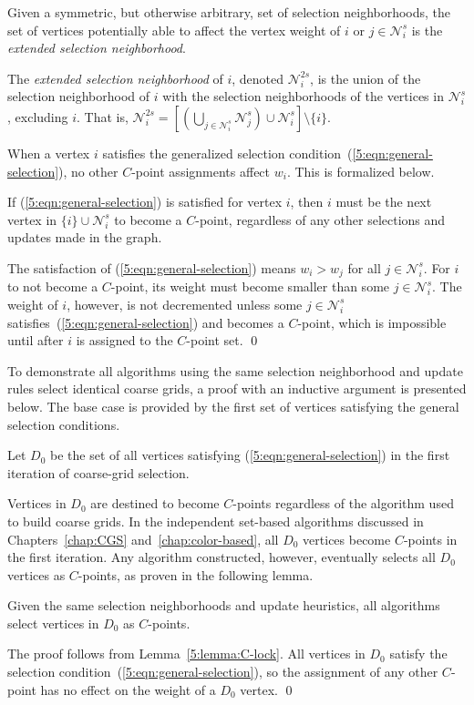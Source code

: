 \documentclass{elsart}
\newenvironment{proof}{\begin{pf}}{\qed\end{pf}}
\begin{document}
Given a symmetric, but otherwise arbitrary, set of selection
neighborhoods, the set of vertices potentially able to affect the
vertex weight of $i$ or $j \in \mathcal{N}_i^s$ is the \emph{extended
selection neighborhood}.
\begin{defn}
The \emph{extended selection neighborhood} of $i$, denoted
$\mathcal{N}_i^{2s}$, is the union of the selection neighborhood of
$i$ with the selection neighborhoods of the vertices in
$\mathcal{N}_i^s$, excluding $i$. That is, $\mathcal{N}_i^{2s} =
\left[\left(\bigcup_{j \in \mathcal{N}_i^s}\mathcal{N}_j^s\right)\cup
\mathcal{N}_i^s\right] \setminus \{i\}$.
\end{defn}

When a vertex $i$ satisfies the generalized selection
condition~(\ref{5:eqn:general-selection}), no other $C$-point
assignments affect $w_i$. This is formalized below.
\begin{lem}
\label{5:lemma:C-lock}
If (\ref{5:eqn:general-selection}) is satisfied for vertex $i$, then
$i$ must be the next vertex in $\{i\} \cup \mathcal{N}_i^s$ to become
a $C$-point, regardless of any other selections and updates made in
the graph.
\end{lem}
\begin{proof}
The satisfaction of (\ref{5:eqn:general-selection}) means $w_i > w_j$
for all $j \in \mathcal{N}_i^s$. For $i$ to not become a $C$-point,
its weight must become smaller than some $j \in \mathcal{N}_i^s$. The
weight of $i$, however, is not decremented unless some $j \in
\mathcal{N}_i^s$ satisfies~(\ref{5:eqn:general-selection}) and becomes
a $C$-point, which is impossible until after $i$ is assigned to the
$C$-point set.
\end{proof}

To demonstrate all algorithms using the same selection neighborhood
and update rules select identical coarse grids, a proof with an
inductive argument is presented below. The base case is provided by
the first set of vertices satisfying the general selection conditions.
\begin{defn}
Let $D_0$ be the set of all vertices satisfying
(\ref{5:eqn:general-selection}) in the first iteration of coarse-grid
selection.
\end{defn}

Vertices in $D_0$ are destined to become $C$-points regardless of the
algorithm used to build coarse grids. In the independent set-based
algorithms discussed in Chapters~\ref{chap:CGS}
and~\ref{chap:color-based}, all $D_0$ vertices become $C$-points in
the first iteration. Any algorithm constructed, however, eventually
selects all $D_0$ vertices as $C$-points, as proven in the following
lemma.
\begin{lem}
\label{5:lemma:D0_invariant}
Given the same selection neighborhoods and update heuristics, all
algorithms select vertices in $D_0$ as $C$-points.
\end{lem}
\begin{proof}
The proof follows from Lemma~\ref{5:lemma:C-lock}. All vertices in
$D_0$ satisfy the selection condition~(\ref{5:eqn:general-selection}),
so the assignment of any other $C$-point has no effect on the weight
of a $D_0$ vertex.
\end{proof}
\end{document}

